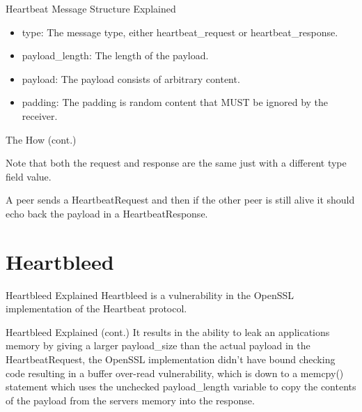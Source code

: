 \documentclass{beamer}
\begin{document}
\begin{frame}{Heartbeat Message Structure Explained}
    \begin{itemize}
        \item

            type:  The message type, either heartbeat\_request or
            heartbeat\_response.


        \item
            payload\_length:  The length of the payload.

        \item
            payload:  The payload consists of arbitrary content.


        \item
            padding:  The padding is random content that MUST be ignored by the
            receiver.
    \end{itemize}

\end{frame}

\begin{frame}{The How (cont.)}

    Note that both the request and response are the same just with a different type field value.

    A peer sends a HeartbeatRequest and then if the other peer is still alive it should echo
    back the payload in a HeartbeatResponse.

\end{frame}

\section{Heartbleed}
\begin{frame}{Heartbleed Explained}
    Heartbleed is a vulnerability in the OpenSSL implementation of the Heartbeat protocol.

\end{frame}

\begin{frame}{Heartbleed Explained (cont.)}
    It results in the ability to leak an applications memory by giving a larger payload\_size
    than the actual payload in the HeartbeatRequest, the OpenSSL implementation didn't have
    bound checking code resulting in a buffer over-read vulnerability, which is down to a
    memcpy() statement which uses the unchecked payload\_length variable to copy the
    contents of the payload from the servers memory into the response.

\end{frame}
\end{document}
